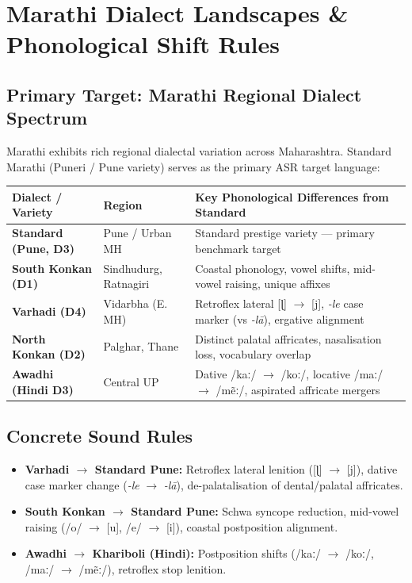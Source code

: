 \documentclass[11pt]{article}
\begin{document}
\section{Marathi Dialect Landscapes \& Phonological Shift Rules}

\subsection{Primary Target: Marathi Regional Dialect Spectrum}
Marathi exhibits rich regional dialectal variation across Maharashtra. Standard Marathi (Puneri / Pune variety) serves as the primary ASR target language:

\small
\begin{longtable}{ll>{\raggedright\arraybackslash}p{5.5cm}}
\toprule
\textbf{Dialect / Variety} & \textbf{Region} & \textbf{Key Phonological Differences from Standard} \\
\midrule
\endhead
\bottomrule
\endfoot
\textbf{Standard (Pune, D3)} & Pune / Urban MH & Standard prestige variety --- primary benchmark target \\
\textbf{South Konkan (D1)} & Sindhudurg, Ratnagiri & Coastal phonology, vowel shifts, mid-vowel raising, unique affixes \\
\textbf{Varhadi (D4)} & Vidarbha (E. MH) & Retroflex lateral [ɭ] $\rightarrow$ [j], \textit{-le} case marker (vs \textit{-lā}), ergative alignment \\
\textbf{North Konkan (D2)} & Palghar, Thane & Distinct palatal affricates, nasalisation loss, vocabulary overlap \\
\textbf{Awadhi (Hindi D3)} & Central UP & Dative /kaː/ $\to$ /koː/, locative /maː/ $\to$ /mẽː/, aspirated affricate mergers \\
\end{longtable}
\normalsize

\subsection{Concrete Sound Rules}
\begin{itemize}[leftmargin=*]
  \item \textbf{Varhadi $\rightarrow$ Standard Pune:}
    Retroflex lateral lenition ([ɭ] $\rightarrow$ [j]), dative case marker change (\textit{-le} $\rightarrow$ \textit{-lā}), de-palatalisation of dental/palatal affricates.
  \item \textbf{South Konkan $\rightarrow$ Standard Pune:}
    Schwa syncope reduction, mid-vowel raising (/o/ $\to$ [u], /e/ $\to$ [i]), coastal postposition alignment.
  \item \textbf{Awadhi $\rightarrow$ Khariboli (Hindi):}
    Postposition shifts (/kaː/ $\to$ /koː/, /maː/ $\to$ /mẽː/), retroflex stop lenition.
\end{itemize}
\end{document}
